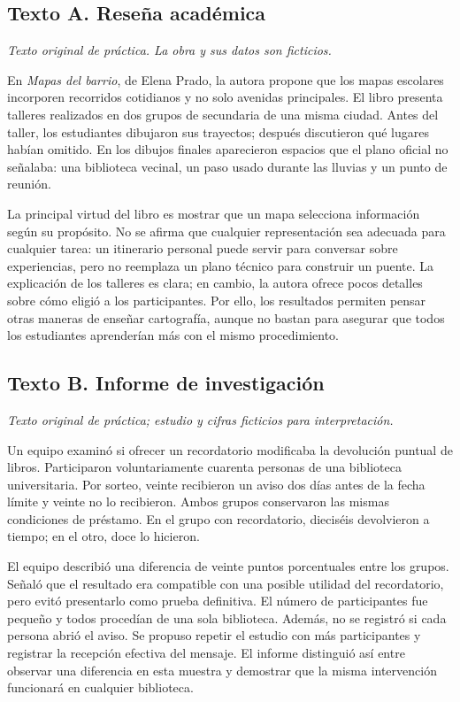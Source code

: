 \subsection*{Texto A. Reseña académica}
\textit{Texto original de práctica. La obra y sus datos son ficticios.}

En \emph{Mapas del barrio}, de Elena Prado, la autora propone que los mapas escolares incorporen recorridos cotidianos y no solo avenidas principales. El libro presenta talleres realizados en dos grupos de secundaria de una misma ciudad. Antes del taller, los estudiantes dibujaron sus trayectos; después discutieron qué lugares habían omitido. En los dibujos finales aparecieron espacios que el plano oficial no señalaba: una biblioteca vecinal, un paso usado durante las lluvias y un punto de reunión.

La principal virtud del libro es mostrar que un mapa selecciona información según su propósito. No se afirma que cualquier representación sea adecuada para cualquier tarea: un itinerario personal puede servir para conversar sobre experiencias, pero no reemplaza un plano técnico para construir un puente. La explicación de los talleres es clara; en cambio, la autora ofrece pocos detalles sobre cómo eligió a los participantes. Por ello, los resultados permiten pensar otras maneras de enseñar cartografía, aunque no bastan para asegurar que todos los estudiantes aprenderían más con el mismo procedimiento.

\subsection*{Texto B. Informe de investigación}
\textit{Texto original de práctica; estudio y cifras ficticios para interpretación.}

Un equipo examinó si ofrecer un recordatorio modificaba la devolución puntual de libros. Participaron voluntariamente cuarenta personas de una biblioteca universitaria. Por sorteo, veinte recibieron un aviso dos días antes de la fecha límite y veinte no lo recibieron. Ambos grupos conservaron las mismas condiciones de préstamo. En el grupo con recordatorio, dieciséis devolvieron a tiempo; en el otro, doce lo hicieron.

El equipo describió una diferencia de veinte puntos porcentuales entre los grupos. Señaló que el resultado era compatible con una posible utilidad del recordatorio, pero evitó presentarlo como prueba definitiva. El número de participantes fue pequeño y todos procedían de una sola biblioteca. Además, no se registró si cada persona abrió el aviso. Se propuso repetir el estudio con más participantes y registrar la recepción efectiva del mensaje. El informe distinguió así entre observar una diferencia en esta muestra y demostrar que la misma intervención funcionará en cualquier biblioteca.

